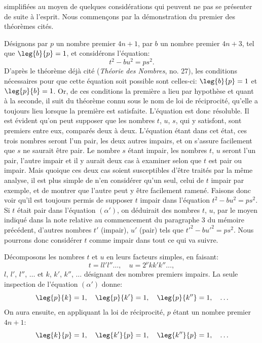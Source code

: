 \noindent
simplifiées au moyen de quelques considérations qui peuvent ne pas se
présenter de suite à l'esprit. Nous commençons par la démonstration du premier
des théorèmes cités.
\par\indent
Désignons par $p$ un nombre premier $4n+1$, par $b$ un nombre premier
$4n+3$, tel que $\leg{b}{p}=1$, et considérons l'équation:
\begin{equation*}\tag{$\alpha'$}
t^2-bu^2=ps^2.
\end{equation*}
D'après le théorème déjà cité (\emph{Théorie des Nombres}, no. 27), les conditions
nécessaires pour que cette équation soit possible sont celles-ci: $\leg{b}{p}=1$ et
$\leg{p}{b}=1$. Or, de ces conditions la première a lieu par hypothèse et quant
à la seconde, il suit du théorème connu sous le nom de loi de réciprocité,
qu'elle a toujours lieu lorsque la première est satisfaite. L'équation est donc
résoluble. Il est évident qu'on peut supposer que les nombres $t$, $u$, $s$, qui y
satisfont, sont premiers entre eux, comparés deux à deux. L'équation étant
dans cet état, ces trois nombres seront l'un pair, les deux autres impairs, et
on s'assure facilement que $s$ ne saurait être pair. Le nombre $s$ étant impair,
les nombres $t$, $u$ seront l'un pair, l'autre impair et il y aurait deux cas à
examiner selon que $t$ est pair ou impair. Mais quoique ces deux cas soient
susceptibles d'être traités par la même analyse, il est plus simple de n'en
considérer qu'un seul, celui de $t$ impair par exemple, et de montrer que l'autre
peut y être facilement ramené. Faisons donc voir qu'il est toujours permis de
supposer $t$ impair dans l'équation $t^2-bu^2=ps^2$. Si $t$ était pair dans
l'équation $(\alpha')$, on déduirait des nombres $t$, $u$, par le moyen indiqué dans la note
relative au commencement du paragraphe 3 du mémoire précédent, d'autres
nombres $t'$ (impair), $u'$ (pair) tels que $t'^2-bu'^2=ps^2$. Nous pourrons donc
considérer $t$ comme impair dans tout ce qui va suivre.
\par\indent
Décomposons les nombres $t$ et $u$ en leurs facteurs simples, en faisant:
\[
t=ll'l''\ldots,\quad u=2^\nu kk'k''\ldots,
\]
$l$, $l'$, $l''$, $\ldots$ et $k$, $k'$, $k''$, $\ldots$ désignant des nombres premiers impairs. La seule
inspection de l'équation $(\alpha')$ donne:
\[
\leg{p}{k}=1,\quad\leg{p}{k'}=1,\quad\leg{p}{k''}=1,\quad\ldots
\]
On aura ensuite, en appliquant la loi de réciprocité, $p$ étant un nombre
premier $4n+1$:
\[
\leg{k}{p}=1,\quad\leg{k'}{p}=1,\quad\leg{k''}{p}=1,\quad\ldots
\]
